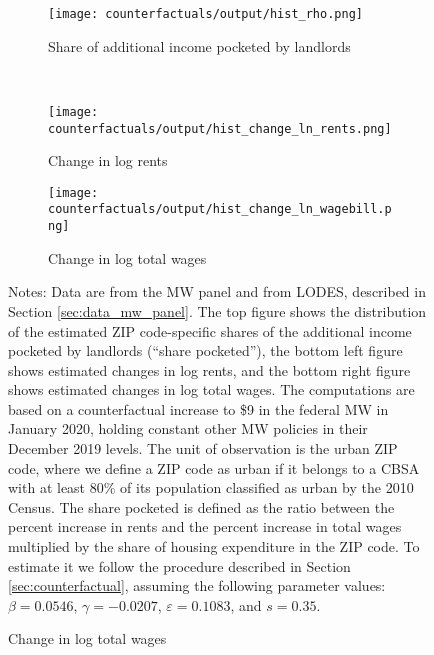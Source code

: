 \begin{figure}[h!]
    \centering
    \caption{Distributions of estimated shares pocketed by landlords under a 
            counterfactual federal MW policy of \$9, urban ZIP codes}
    \label{fig:cf_hist_rents_wages_shares}

    \begin{subfigure}{0.65\textwidth}
        \caption*{Share of additional income pocketed by landlords}
        \texttt{[image: counterfactuals/output/hist\_rho.png]}
    \end{subfigure}\\
    \begin{subfigure}{0.5\textwidth}
        \caption*{Change in log rents}
        \texttt{[image: counterfactuals/output/hist\_change\_ln\_rents.png]}
    \end{subfigure}%
    \begin{subfigure}{0.5\textwidth}
        \caption*{Change in log total wages}
        \texttt{[image: counterfactuals/output/hist\_change\_ln\_wagebill.png]}
    \end{subfigure}

    \begin{minipage}{.95\textwidth} \footnotesize
        \vspace{3mm}
        Notes:
        Data are from the MW panel and from LODES, described in
        Section \ref{sec:data_mw_panel}.
        The top figure shows the distribution of the estimated ZIP code-specific
        shares of the additional income pocketed by landlords (``share pocketed''), 
        the bottom left figure shows estimated changes in log rents, and 
        the bottom right figure shows estimated changes in log total wages.
        The computations are based on a counterfactual increase to \$9 in the 
        federal MW in January 2020, holding constant other MW policies in their 
        December 2019 levels.
        The unit of observation is the urban ZIP code, where we define a ZIP code 
        as urban if it belongs to a CBSA with at least 80\% of its population 
        classified as urban by the 2010 Census.
        The share pocketed is defined as the ratio between the percent increase 
        in rents and the percent increase in total wages multiplied by the share 
        of housing expenditure in the ZIP code.
        To estimate it we follow the procedure described in Section 
        \ref{sec:counterfactual}, assuming the following parameter values: 
        $\beta = 0.0546$, $\gamma = -0.0207$, $\varepsilon = 0.1083$, and 
        $s = 0.35$.
    \end{minipage}
\end{figure}
